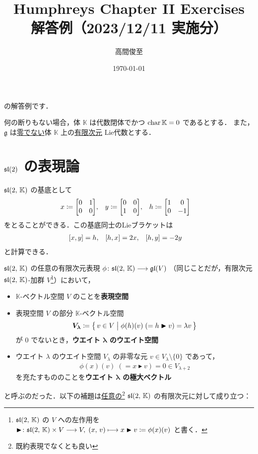 \documentclass{ltjsarticle}
\theoremstyle{mystyle} %
\numberwithin{equation}{section}
\newcommand{\lto}{\longrightarrow}
\newcommand{\lmto}{\longmapsto}
\newcommand{\btr}{\blacktriangleright}
\begin{document}
\title{Humphreys Chapter II Exercises \\ 解答例（2023/12/11 実施分）}
\author{高間俊至}
\date{\today}
\maketitle

\setcounter{section}{1}

\cite[p.34, Exercise1, 2; p.40, Exercise1, 2, 10]{Humphreys1972introduction}
の解答例です．

何の断りもない場合，体 $\mathbb{K}$ は代数閉体でかつ $\operatorname{char} \mathbb{K} = 0$ であるとする．
また，$\mathfrak{g}$ は\underline{零でない}体 $\mathbb{K}$ 上の\underline{有限次元} Lie代数とする．

\section{$\mathfrak{sl}(2)$ の表現論}

$\mathfrak{sl}(2,\, \mathbb{K})$ の基底として
\begin{align}
    x &\coloneqq \mqty[0 & 1 \\ 0&0], & y &\coloneqq \mqty[0&0 \\ 1 &0], & h &\coloneqq \mqty[1 & 0 \\ 0 & -1]
\end{align}
をとることができる．この基底同士のLieブラケットは
\begin{align}
    \label{eq:comm-sl2}
    \comm{x}{y} &= h, & \comm{h}{x} &= 2x, & \comm{h}{y} &= -2y
\end{align}
と計算できる．

$\mathfrak{sl}(2,\, \mathbb{K})$ の任意の有限次元表現 $\phi \colon \Lsl(2,\, \mathbb{K}) \lto \Lgl(V)$ 
（同じことだが，有限次元 $\mathfrak{sl}(2,\, \mathbb{K})$-加群 $V$\footnote{$\mathfrak{sl}(2,\, \mathbb{K})$ の $V$ への左作用を $\btr \colon \Lsl(2,\, \mathbb{K}) \times V \lto V,\; (x,\, v) \lmto x \btr v \coloneqq \phi(x)(v)$ と書く．}）において，
\begin{itemize}
    \item $\mathbb{K}$-ベクトル空間 $V$ のことを\textbf{表現空間}
    \item 表現空間 $V$ の部分 $\mathbb{K}$-ベクトル空間 
    \begin{align}
        \bm{V_\lambda} \coloneqq \bigl\{\, v \in V \bigm| \phi(h)(v)\; (= h \btr v) = \lambda v \,\bigr\} 
    \end{align}
    が $0$ でないとき，\textbf{ウエイト $\bm{\lambda}$ のウエイト空間}
    \item ウエイト $\lambda$ のウエイト空間 $V_\lambda$ の非零な元 $v \in V_\lambda \setminus \{0\}$ であって，
    \begin{align}
        \phi(x)(v) \; (= x \btr v) = 0 \in V_{\lambda+2}
    \end{align}
    を充たすもののことを\textbf{ウエイト $\bm{\lambda}$ の極大ベクトル}
\end{itemize}
と呼ぶのだった．以下の補題は\underline{任意の}\footnote{既約表現でなくとも良い} $\mathfrak{sl}(2,\, \mathbb{K})$ の有限次元に対して成り立つ：
\end{document}
